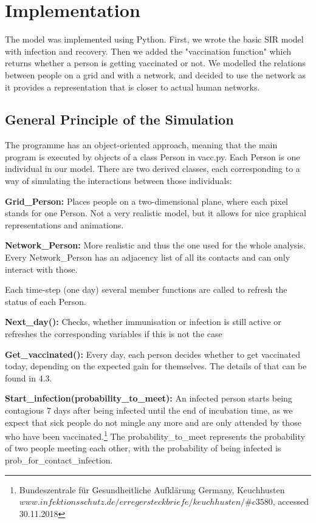 \documentclass[11pt]{article}
\begin{document}
\section{Implementation}
The model was implemented using Python. First, we wrote the basic SIR model with infection and recovery. Then we added the "vaccination function" which returns whether a person is getting vaccinated or not. We modelled the relations between people on a grid and with a network, and decided to use the network as it provides a representation that is closer to actual human networks. 

\vspace{14px}

\subsection{General Principle of the Simulation}
The programme has an object-oriented approach, meaning that the main program is executed by objects of a class Person in vacc.py. Each Person is one individual in our model. There are two derived classes, each corresponding to a way of simulating the interactions between those individuals:
\vspace{14px}

\textbf{Grid\_Person:} Places people on a two-dimensional plane, where each pixel stands for one Person. Not a very realistic model, but it allows for nice graphical representations and animations.
\vspace{14px}

\textbf{Network\_Person:} More realistic and thus the one used for the whole analysis. Every Network\_Person has an adjacency list of all its contacts and can only interact with those.
\vspace{14px}

Each time-step (one day) several member functions are called to refresh the status of each Person.

\textbf{Next\_day():} Checks, whether immunisation or infection is still active or refreshes the corresponding variables if this is not the case

\textbf{Get\_vaccinated():} Every day, each person decides whether to get vaccinated today, depending on the expected gain for themselves. The details of that can be found in 4.3. 

\textbf{Start\_infection(probability\_to\_meet):} An infected person starts being contagious 7 days after being infected until the end of incubation time, as we expect that sick people do not mingle any more and are only attended by those who have been vaccinated.\footnote{Bundeszentrale für Gesundheitliche Aufklärung Germany, Keuchhusten \break
$www.infektionsschutz.de/erregersteckbriefe/keuchhusten/\#c3580$, accessed 30.11.2018} The probability\_to\_meet represents the probability of two people meeting each other, with the probability of being infected is prob\_for\_contact\_infection.
\vspace{14px}
\end{document}
